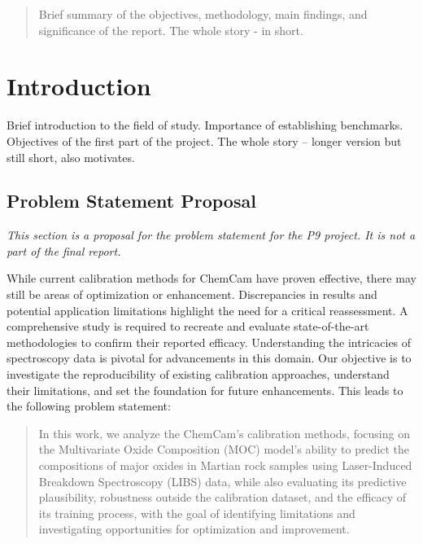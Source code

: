 \begin{abstract}
     Brief summary of the objectives, methodology, main findings, and significance of the report. The whole story - in short.
\end{abstract}



\section{Introduction}
Brief introduction to the field of study.
Importance of establishing benchmarks.
Objectives of the first part of the project.
The whole story – longer version but still short, also motivates.

\subsection{Problem Statement Proposal}
\textit{This section is a proposal for the problem statement for the P9 project. It is not a part of the final report.}

\vspace{0.5cm}
\noindent
While current calibration methods for ChemCam have proven effective, there may still be areas of optimization or enhancement.
Discrepancies in results and potential application limitations highlight the need for a critical reassessment.
A comprehensive study is required to recreate and evaluate state-of-the-art methodologies to confirm their reported efficacy.
Understanding the intricacies of spectroscopy data is pivotal for advancements in this domain.
Our objective is to investigate the reproducibility of existing calibration approaches, understand their limitations, and set the foundation for future enhancements.
\noindent
This leads to the following problem statement:

\begin{quote}
    In this work, we analyze the ChemCam's calibration methods, focusing on the Multivariate Oxide Composition (MOC) model's ability to predict the compositions of major oxides in Martian rock samples using Laser-Induced Breakdown Spectroscopy (LIBS) data, while also evaluating its predictive plausibility, robustness outside the calibration dataset, and the efficacy of its training process, with the goal of identifying limitations and investigating opportunities for optimization and improvement.
\end{quote}


